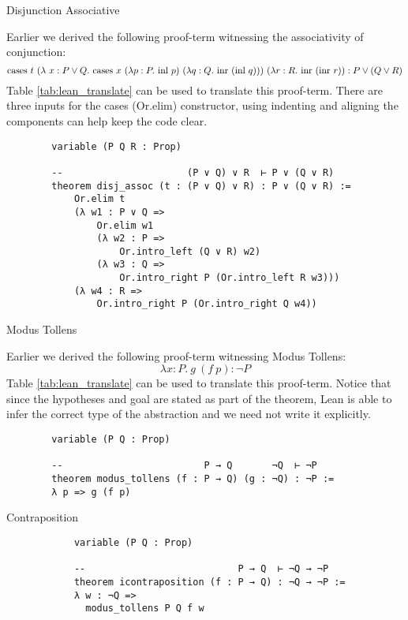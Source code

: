 \documentclass{book}
\begin{document}
    \begin{eg}{Disjunction Associative}
        
        Earlier we derived the following proof-term witnessing the associativity of conjunction:
        $$ \text{cases} \ t \ (\lambda \ x : P \lor Q. \ \text{cases} \ x \ (\lambda p : P. \ \text{inl} \ p) \ (\lambda q : Q. \ \text{inr} \ (\text{inl} \ q))) \ (\lambda r : R. \ \text{inr} \ (\text{inr} \ r)) : P \lor (Q \lor R) $$
        Table \ref{tab:lean_translate} can be used to translate this proof-term. There are three inputs for the cases (Or.elim) constructor, using indenting and aligning the components can help keep the code clear. 

        \begin{lstlisting}
        variable (P Q R : Prop)
        
        --                      (P ∨ Q) ∨ R  ⊢ P ∨ (Q ∨ R)
        theorem disj_assoc (t : (P ∨ Q) ∨ R) : P ∨ (Q ∨ R) :=
            Or.elim t
            (λ w1 : P ∨ Q =>
                Or.elim w1
                (λ w2 : P =>
                    Or.intro_left (Q ∨ R) w2)
                (λ w3 : Q =>
                    Or.intro_right P (Or.intro_left R w3)))
            (λ w4 : R =>
                Or.intro_right P (Or.intro_right Q w4))
        \end{lstlisting}        
    \end{eg}

    \begin{eg}{Modus Tollens}
        
        Earlier we derived the following proof-term witnessing Modus Tollens:
        $$ \lambda x : P. \ g \ (f \ p) : \lnot P $$
        Table \ref{tab:lean_translate} can be used to translate this proof-term. Notice that since the hypotheses and goal are stated as part of the theorem, Lean is able to infer the correct type of the abstraction and we need not write it explicitly. 

        \begin{lstlisting}
        variable (P Q : Prop)
        
        --                         P → Q       ¬Q  ⊢ ¬P
        theorem modus_tollens (f : P → Q) (g : ¬Q) : ¬P :=
        λ p => g (f p)
        \end{lstlisting}        
    \end{eg}

    \begin{eg}{Contraposition}
        \begin{lstlisting}
            variable (P Q : Prop)
            
            --                           P → Q  ⊢ ¬Q → ¬P
            theorem icontraposition (f : P → Q) : ¬Q → ¬P :=
            λ w : ¬Q =>
              modus_tollens P Q f w
            \end{lstlisting}    
    \end{eg}
    
\end{document}
